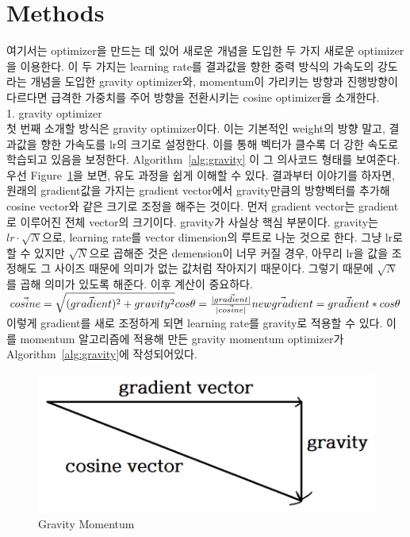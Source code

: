 \documentclass{article}
\begin{document}
\section{Methods}
여기서는 optimizer을 만드는 데 있어 새로운 개념을 도입한 두 가지 새로운 optimizer을 이용한다. 이 두 가지는 learning rate를 결과값을 향한 중력 방식의 가속도의 강도라는 개념을 도입한 gravity optimizer와, momentum이 가리키는 방향과 진행방향이 다르다면 급격한 가중치를 주어 방향을 전환시키는 cosine optimizer을 소개한다.\\
1. gravity optimizer\\
첫 번째 소개할 방식은 gravity optimizer이다. 이는 기본적인 weight의 방향 말고, 결과값을 향한 가속도를 lr의 크기로 설정한다. 이를 통해 벡터가 클수록 더 강한 속도로 학습되고 있음을 보정한다. Algorithm~\ref{alg:gravity} 이 그 의사코드 형태를 보여준다. \\
우선 Figure~\ref{prf:cosine}을 보면, 유도 과정을 쉽게 이해할 수 있다. 결과부터 이야기를 하자면, 원래의 gradient값을 가지는 gradient vector에서 gravity만큼의 방향벡터를 추가해 cosine vector와 같은 크기로 조정을 해주는 것이다. 먼저 gradient vector는 gradient로 이루어진 전체 vector의 크기이다. gravity가 사실상 핵심 부분이다. gravity는 $lr\cdot\sqrt{N}$으로, learning rate를 vector dimension의 루트로 나눈 것으로 한다. 그냥 lr로 할 수 있지만 $\sqrt{N}$으로 곱해준 것은 demension이 너무 커질 경우, 아무리 lr을 값을 조정해도 그 사이즈 때문에 의미가 없는 값처럼 작아지기 때문이다. 그렇기 때문에 $\sqrt{N}$를 곱해 의미가 있도록 해준다. 이후 계산이 중요하다. \\
$\vec{cosine}=\sqrt{(\vec{gradient})^2+gravity^2} \\
cos\theta=\frac{|\vec{gradient|}}{|\vec{cosine}|} \\
\vec{newgradient}=\vec{gradient}*cos\theta $ \\
이렇게 gradient를 새로 조정하게 되면 learning rate를 gravity로 적용할 수 있다. 이를 momentum 알고리즘에 적용해 만든 gravity momentum optimizer가 Algorithm~\ref{alg:gravity}에 작성되어있다.

\begin{figure}
   \includegraphics[width=\columnwidth]{img/cosine vector.jpg}
   \caption{Gravity Momentum}
   \label{prf:cosine}
\end{figure}
\end{document}
